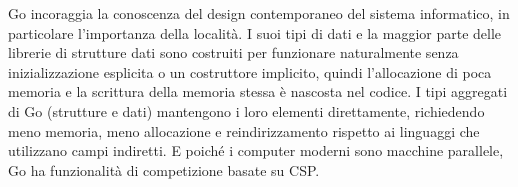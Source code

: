 Go incoraggia la conoscenza del design contemporaneo del sistema informatico, in particolare l'importanza della località.
I suoi tipi di dati e la maggior parte delle librerie di strutture dati sono costruiti per funzionare naturalmente senza inizializzazione esplicita o un costruttore implicito, quindi l'allocazione di poca memoria e la scrittura della memoria stessa è nascosta nel codice.
I tipi aggregati di Go (strutture e dati) mantengono i loro elementi direttamente, richiedendo meno memoria, meno allocazione e reindirizzamento rispetto ai linguaggi che utilizzano campi indiretti.
E poiché i computer moderni sono macchine parallele, Go ha funzionalità di competizione basate su CSP\@.